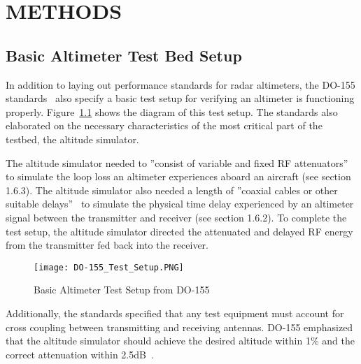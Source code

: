 %
%
%
%



\chapter{METHODS}
\section{Basic Altimeter Test Bed Setup}
In addition to laying out performance standards for radar altimeters, the DO-155 standards~\cite{noauthor_minimum_1974} also specify a basic test setup for verifying an altimeter is functioning properly. Figure~\ref{fig:Basic Testbed} shows the diagram of this test setup. The standards also elaborated on the necessary characteristics of the most critical part of the testbed, the altitude simulator. 

The altitude simulator needed to ''consist of variable and fixed RF attenuators''~\cite{noauthor_minimum_1974}  to simulate the loop loss an altimeter experiences aboard an aircraft (see section 1.6.3). The altitude simulator also needed a length of ''coaxial cables or other suitable delays''~\cite{noauthor_minimum_1974}  to simulate the physical time delay experienced by an altimeter signal between the transmitter and receiver (see section 1.6.2). To complete the test setup, the altitude simulator directed the attenuated and delayed RF energy from the transmitter fed back into the receiver. 
\begin{figure}[ht]
\centering
\texttt{[image: DO-155\_Test\_Setup.PNG]}
\caption[]{Basic Altimeter Test Setup from DO-155~\cite{noauthor_minimum_1974}}

\label{fig:Basic Testbed}

\end{figure}

Additionally, the standards specified that any test equipment must account for cross coupling between transmitting and receiving antennas. DO-155 emphasized that the altitude simulator should achieve the desired altitude within 1\% and the correct attenuation within 2.5dB~\cite{noauthor_minimum_1974}.


